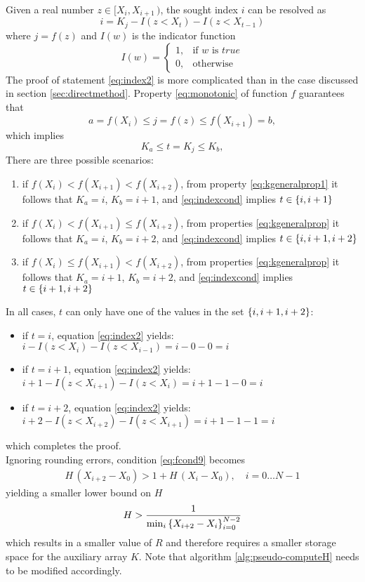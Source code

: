 \documentclass[preprint,1p,times]{elsarticle}
\begin{document}
Given a real number $z\in[X_{i},X_{i+1}\,)$, the sought index $i$ can be resolved as
\begin{equation}
\label{eq:index2}
	i=K_j-I(z<X_t)-I(z<X_{t-1})
\end{equation}
where $j=f(z)$ and $I(w)$ is the indicator function
$$
	I(w)=\left\{\begin{array}{ll}
		1, &\text{if $w$ is $true$} \\
		0, &\text{otherwise}
	\end{array}\right.
$$
The proof of statement \eqref{eq:index2} is more complicated than in the case discussed in section \ref{sec:directmethod}.
Property \eqref{eq:monotonic} of function $f$ guarantees that
$$
 	a=f(X_{i}) \leq j=f(z) \leq f(X_{i+1})=b,
$$
which implies
\begin{equation}
\label{eq:indexcond}
K_a \leq t=K_j \leq K_b,
\end{equation}
There are three possible scenarios:
\begin{enumerate}
	\item if $f(X_{i})<f(X_{i+1})<f(X_{i+2})$, from property \eqref{eq:kgeneralprop1} it follows that $K_a=i$, $K_b=i+1$, and \eqref{eq:indexcond} implies $t \in \left \{ i,i+1 \right \}$
	\item if $f(X_{i})<f(X_{i+1}) \leq f(X_{i+2})$, from properties \eqref{eq:kgeneralprop} it follows that $K_a=i$, $K_b=i+2$, and \eqref{eq:indexcond} implies $t \in \left \{ i,i+1,i+2 \right \}$
	\item if $f(X_{i})\leq f(X_{i+1}) < f(X_{i+2})$, from properties \eqref{eq:kgeneralprop} it follows that $K_a=i+1$, $K_b=i+2$, and \eqref{eq:indexcond} implies $t \in \left \{ i+1,i+2 \right \}$
\end{enumerate}
In all cases, $t$ can only have one of the values in the set $\left \{ i,i+1,i+2 \right \}$:
\begin{itemize}
	\item if $t=i$, equation \eqref{eq:index2} yields: $i-I(z<X_i)-I(z<X_{i-1})=i-0-0=i$
	\item if $t=i+1$, equation \eqref{eq:index2} yields: $i+1-I(z<X_{i+1})-I(z<X_{i})=i+1-1-0=i$
	\item if $t=i+2$, equation \eqref{eq:index2} yields: $i+2-I(z<X_{i+2})-I(z<X_{i+1})=i+1-1-1=i$
\end{itemize}
which completes the proof. \\

Ignoring rounding errors, condition \eqref{eq:fcond9} becomes
\begin{align}
\label{eq:fcond10}
	H\,(X_{i+2}-X_0) > 1+ H\,(X_i-X_0), \quad  i=0 \dots N-1
\end{align}
yielding a smaller lower bound on $H$
\begin{align}
\label{eq:fcond11}
	H > \frac{1}{\min_i\left \{ X_{i+2}-X_i \right \}_{i=0}^{N-2}}
\end{align}
which results in a smaller value of $R$ and therefore requires a smaller storage space for the auxiliary array $K$. Note that algorithm \ref{alg:pseudo-computeH} needs to be modified accordingly. \\
\end{document}
